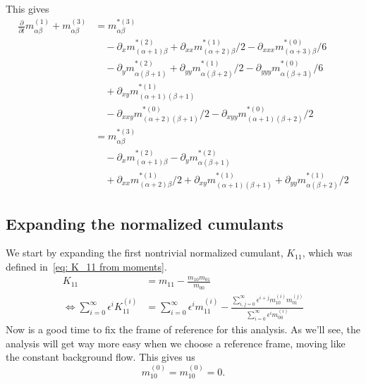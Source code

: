 This gives
\begin{equation}
  \label{eq:third order in epsilon}
  \begin{aligned}
    \frac{\partial}{\partial t} m_{\alpha\beta}^{(1)} + m_{\alpha\beta}^{(3)}
    & =  m_{\alpha\beta}^{*(3)} \\
    &\quad - \partial_x m_{(\alpha+1)\beta}^{*(2)} + \partial_{xx} m_{(\alpha+2)\beta}^{*(1)}/2 - \partial_{xxx} m_{(\alpha+3)\beta}^{*(0)}/6 \\
    &\quad - \partial_y m_{\alpha(\beta+1)}^{*(2)} + \partial_{yy} m_{\alpha(\beta+2)}^{*(1)}/2 - \partial_{yyy} m_{\alpha(\beta+3)}^{*(0)}/6 \\
    &\quad + \partial_{xy} m_{(\alpha+1)(\beta+1)}^{*(1)} \\
    &\quad - \partial_{xxy} m_{(\alpha+2)(\beta+1)}^{*(0)}/2 - \partial_{xyy} m_{(\alpha+1)(\beta+2)}^{*(0)}/2 \\
    & =  m_{\alpha\beta}^{*(3)} \\
    &\quad - \partial_x m_{(\alpha+1)\beta}^{*(2)} - \partial_y m_{\alpha(\beta+1)}^{*(2)}  \\
    &\quad  + \partial_{xx} m_{(\alpha+2)\beta}^{*(1)}/2 + \partial_{xy} m_{(\alpha+1)(\beta+1)}^{*(1)} + \partial_{yy} m_{\alpha(\beta+2)}^{*(1)}/2
  \end{aligned}
\end{equation}

\subsection{Expanding the normalized cumulants}
\label{sub:Expanding the normalized cumulants}
We start by expanding the first nontrivial normalized cumulant, $K_{11}$, which was defined in~\eqref{eq: K_11 from moments}.
\begin{equation}
  \begin{aligned}
    K_{11} & = m_{11} - \frac{m_{10}m_{01}}{m_{00}}\\
    \Leftrightarrow
    \sum_{i=0}^\infty \epsilon^i K_{11}^{(i)}
    & = \sum_{i=0}^\infty \epsilon^i m_{11}^{(i)} -
    \frac{\sum_{i,j=0}^\infty \epsilon^{i+j} m_{10}^{(i)}m_{01}^{(j)}}
         {\sum_{i=0}^\infty \epsilon^i m_{00}^{(i)}}
  \end{aligned}
\end{equation}
Now is a good time to fix the frame of reference for this analysis. As we'll see, the analysis will get way more easy when we choose a reference frame, moving like the constant background flow. This gives us
\begin{equation}
  \label{eq: frame of reference}
  m_{10}^{(0)}=m_{10}^{(0)} = 0.
\end{equation}

